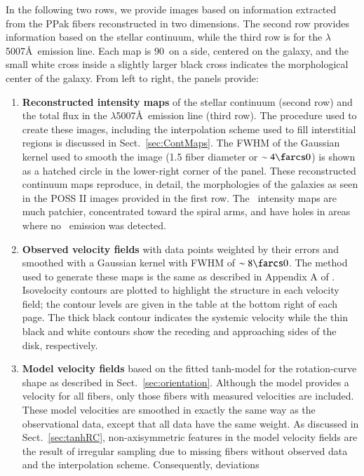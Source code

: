 \documentclass[traditabstract]{aa} %
\begin{document}
In the following two rows, we provide images based on information extracted from
the PPak fibers reconstructed in two dimensions.  The second row provides
information based on the stellar continuum, while the third row is for the
\oiii$\lambda$5007\AA\ emission line.  Each map is 90\arcsec\ on a side,
centered on the galaxy, and the small white cross inside a slightly larger black
cross indicates the morphological center of the galaxy. From left to right, the
panels provide:
%
\begin{enumerate}
%
\item {\bf Reconstructed intensity maps} of the stellar continuum (second row)
and the total flux in the \oiii$\lambda$5007\AA\ emission line (third row).  The
procedure used to create these images, including the interpolation scheme used
to fill interstitial regions is discussed in Sect.~\ref{sec:ContMaps}.  The
FWHM of the Gaussian kernel used to smooth the image (1.5 fiber diameter or
$\sim4\farcs0$) is shown as a hatched circle in the lower-right corner of the
panel.  These reconstructed continuum maps reproduce, in detail, the
morphologies of the galaxies as seen in the POSS II images provided in the first
row. The \oiii\ intensity maps are much patchier, concentrated toward the spiral
arms, and have holes in areas where no \oiii\ emission was detected.
%
\item {\bf Observed velocity fields} with data points weighted by their errors
and smoothed with a Gaussian kernel with FWHM of $\sim8\farcs0$.  The method
used to generate these maps is the same as described in Appendix A of
.  Isovelocity contours are plotted to highlight the
structure in each velocity field; the contour levels are given in the table at
the bottom right of each page.  The thick black contour indicates the systemic
velocity while the thin black and white contours show the receding and
approaching sides of the disk, respectively.
%
\item {\bf Model velocity fields} based on the fitted tanh-model for the
rotation-curve shape as described in Sect.~\ref{sec:orientation}.  Although
the model provides a velocity for all fibers, only those fibers with measured
velocities are included.  These model velocities are smoothed in exactly the
same way as the observational data, except that all data have the same weight.
As discussed in Sect.~\ref{sec:tanhRC}, non-axisymmetric features in the model
velocity fields are the result of irregular sampling due to missing fibers
without observed data and the interpolation scheme.  Consequently, deviations

\end{enumerate}
\end{document}
